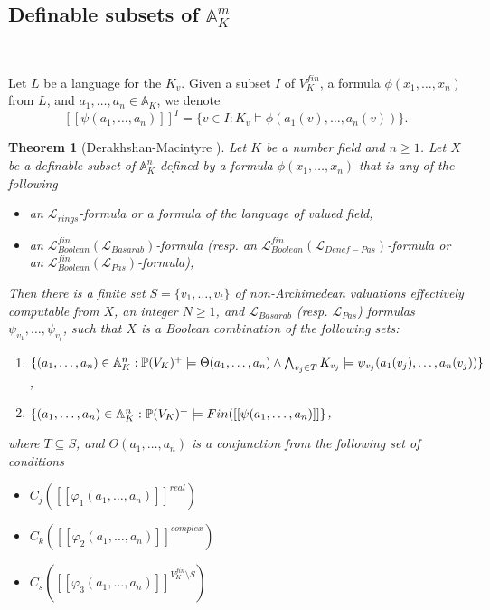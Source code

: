 \documentclass[12pt]{amsart}
\def\A{\mathbb{A}}
\def\P{\mathbb{P}}
\def\cL{\mathcal{L}}
\def\cL{\mathcal{L}}
\newtheorem{thm}{Theorem}[section]
\numberwithin{equation}{section}
\begin{document}
\subsection{\bf Definable subsets of $\A_K^m$}\label{ssec-defset} 

\

\medskip

Let $L$ be a language for the $K_v$. 
Given a subset $I$ of $V_K^{fin}$, a formula $\phi(x_1,\dots,x_n)$ from $L$, and $a_1,\dots,a_n \in \A_K$,
we denote 
$$[[\psi(a_1,\dots,a_n)]]^I=\{v\in I: K_v \models \phi(a_1(v),\dots,a_n(v))\}.$$

\begin{thm}[Derakhshan-Macintyre {\cite{DM-ad}}]
\label{th-def-sets2} 
Let $K$ be a number field and $n\geq 1$. Let $X$ be a definable subset of 
$\A_K^n$ defined by a formula $\phi(x_1,\dots,x_n)$ that is any of the following
\begin{itemize} 
\item an $\cL_{rings}$-formula or a formula of the language of valued field,
\item an $\cL_{Boolean}^{fin}(\cL_{Basarab})$-formula (resp. an $\cL_{Boolean}^{fin}(\cL_{Denef-Pas})$-formula or an $\cL_{Boolean}^{fin}(\cL_{Pas})$-formula),
\end{itemize}
Then there is a finite set $S=\{v_1,\dots,v_t\}$ of non-Archimedean valuations effectively computable from $X$, an integer $N\geq 1$, and $\cL_{Basarab}$ (resp. $\cL_{Pas}$) formulas $\psi_{v_1},\dots,\psi_{v_t}$, such that 
$X$ is a Boolean combination of the following sets:
\begin{enumerate}

\item $\{(a_1,\dots,a_n)\in \A_K^n: \P(V_K)^+\models \Theta(a_1,\dots,a_n) \newline \wedge \bigwedge_{v_j\in T} K_{v_j}\models \psi_{v_j}(a_1(v_j),\dots,a_n(v_j))\}$, 
\item $\{(a_1,\dots,a_n)\in \Bbb A_K^n: \P(V_K)^+\models Fin([[\psi(a_1,\dots,a_n)]]\}$,

\end{enumerate}
where $T\subseteq S$, and $\Theta(a_1,\dots,a_n)$ is a conjunction from the following set of conditions
\begin{itemize}
\item $C_j([[\varphi_1(a_1,\dots,a_n)]]^{real})$
\item $C_k([[\varphi_2(a_1,\dots,a_n)]]^{complex})$
\item $C_s([[\varphi_3(a_1,\dots,a_n)]]^{V_K^{fin}\setminus S})$


\end{itemize}
\end{thm}
\end{document}
